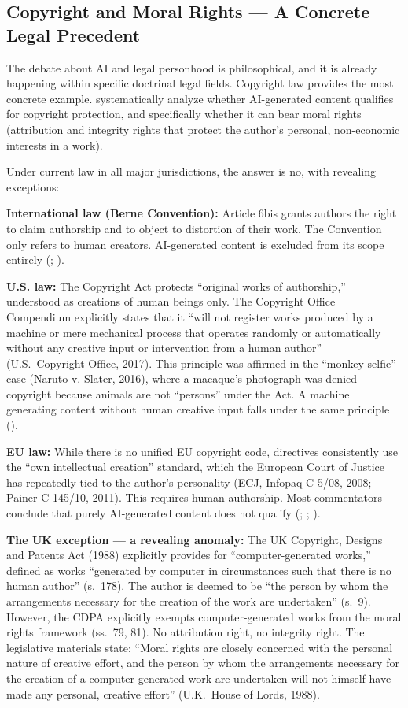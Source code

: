 \documentclass[acmlarge, nonacm]{acmart}
\begin{document}
\subsection{Copyright and Moral Rights --- A Concrete Legal Precedent}

The debate about AI and legal personhood is philosophical, and it is already happening within specific doctrinal legal fields. Copyright law provides the most concrete example. \citet{miernicki2021} systematically analyze whether AI-generated content qualifies for copyright protection, and specifically whether it can bear moral rights (attribution and integrity rights that protect the author's personal, non-economic interests in a work).

Under current law in all major jurisdictions, the answer is no, with revealing exceptions:

\textbf{International law (Berne Convention):} Article 6bis grants authors the right to claim authorship and to object to distortion of their work. The Convention only refers to human creators. AI-generated content is excluded from its scope entirely (\cite{ginsburg2018}; \cite{ricketson1991}).

\textbf{U.S. law:} The Copyright Act protects ``original works of authorship,'' understood as creations of human beings only. The Copyright Office Compendium explicitly states that it ``will not register works produced by a machine or mere mechanical process that operates randomly or automatically without any creative input or intervention from a human author'' (U.S.\ Copyright Office, 2017). This principle was affirmed in the ``monkey selfie'' case (Naruto v. Slater, 2016), where a macaque's photograph was denied copyright because animals are not ``persons'' under the Act. A machine generating content without human creative input falls under the same principle (\cite{miernicki2021}).

\textbf{EU law:} While there is no unified EU copyright code, directives consistently use the ``own intellectual creation'' standard, which the European Court of Justice has repeatedly tied to the author's personality (ECJ, Infopaq C-5/08, 2008; Painer C-145/10, 2011). This requires human authorship. Most commentators conclude that purely AI-generated content does not qualify (\cite{handig2009}; \cite{ihalainen2018}; \cite{miernicki2021}).

\textbf{The UK exception --- a revealing anomaly:} The UK Copyright, Designs and Patents Act (1988) explicitly provides for ``computer-generated works,'' defined as works ``generated by computer in circumstances such that there is no human author'' (s.\ 178). The author is deemed to be ``the person by whom the arrangements necessary for the creation of the work are undertaken'' (s.\ 9). However, the CDPA explicitly exempts computer-generated works from the moral rights framework (ss.\ 79, 81). No attribution right, no integrity right. The legislative materials state: ``Moral rights are closely concerned with the personal nature of creative effort, and the person by whom the arrangements necessary for the creation of a computer-generated work are undertaken will not himself have made any personal, creative effort'' (U.K.\ House of Lords, 1988).
\end{document}
